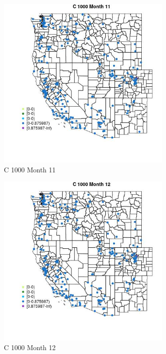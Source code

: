 \begin{figure} 
\centering  
\includegraphics[width=0.77\textwidth]{Code_Outputs/Report_ML_input_PM25_Step4_part_e_de_duplicated_aveswNAs_MapObsMo11C_1000.jpg} 
\caption{\label{fig:Report_ML_input_PM25_Step4_part_e_de_duplicated_aveswNAsMapObsMo11C_1000}C 1000 Month 11} 
\end{figure} 
 

\begin{figure} 
\centering  
\includegraphics[width=0.77\textwidth]{Code_Outputs/Report_ML_input_PM25_Step4_part_e_de_duplicated_aveswNAs_MapObsMo12C_1000.jpg} 
\caption{\label{fig:Report_ML_input_PM25_Step4_part_e_de_duplicated_aveswNAsMapObsMo12C_1000}C 1000 Month 12} 
\end{figure} 
 


